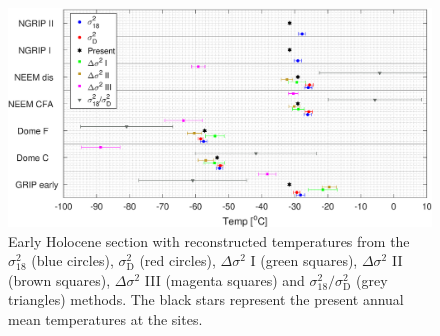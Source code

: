 \documentclass[11pt, draftcls, onecolumn]{IEEEtran} %
\numberwithin{equation}{section}
\numberwithin{table}{section}
\numberwithin{figure}{section}
\begin{document}
\begin{figure}[]
	\vspace*{2mm}
	\begin{center}
		\includegraphics[width=\textwidth]{Figure_13}
		\caption{Early Holocene section with reconstructed temperatures from the $\sigma^2_{18}$ (blue circles), 
			$\sigma^2_{\mathrm{D}}$ (red circles), $\Delta\sigma^2$ I (green squares),
			$\Delta\sigma^2$ II (brown squares), $\Delta\sigma^2$ III (magenta squares) and
			${\sigma^2_{18}}/{\sigma^2_\mathrm{D}}$ (grey triangles) methods.
			The black stars represent the present annual mean temperatures at the sites.}  \label{fig:early_temps}
	\end{center}
\end{figure}
\end{document}
